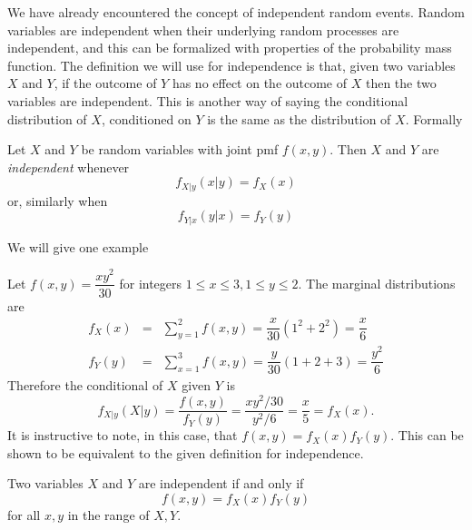\documentclass[../main.tex]{subfiles}
\begin{document}
We have already encountered the concept of independent random events. Random variables
are independent when their underlying random processes are independent, and this
can be formalized with properties of the probability mass function. The definition
we will use for independence is that, given two variables $X$ and $Y$, if the outcome
of $Y$ has no effect on the outcome of $X$ then the two variables are independent. 
This is another way of saying the conditional distribution of $X$, conditioned on $Y$
is the same as the distribution of $X$. Formally
\begin{definition}
	Let $X$ and $Y$ be random variables with joint pmf $f(x,y)$. Then $X$ and $Y$
	are \textit{independent} whenever
	$$f_{X|y}(x|y) = f_X(x)$$
	or, similarly when
	$$f_{Y|x}(y|x) = f_Y(y)$$
\end{definition}
We will give one example
\begin{example}
	Let $f(x,y) = \dfrac{xy^2}{30}$ for integers $1 \leq x \leq 3, 1\leq y \leq 2$. The marginal distributions are
	\begin{eqnarray*}
		f_X(x) &=& \sum_{y=1}^2 f(x,y) = \dfrac{x}{30}(1^2+2^2) = \dfrac{x}{6} \\
		f_Y(y) &=& \sum_{x=1}^3 f(x,y) = \dfrac{y}{30}(1+2+3) = \dfrac{y^2}{6}
	\end{eqnarray*}
	Therefore the conditional of $X$ given $Y$ is
	$$f_{X|y}(X|y) = \dfrac{f(x,y)}{f_{Y}(y)} = \dfrac{xy^2/30}{y^2/6} = \dfrac{x}{5} = f_X(x).$$
	It is instructive to note, in this case, that $f(x,y) = f_X(x)f_Y(y)$. This can be
	shown to be equivalent to the given definition for independence.
\end{example}
\begin{remark}
	Two variables $X$ and $Y$ are independent if and only if
	$$f(x,y) = f_X(x)f_Y(y)$$ for all $x,y$ in the range of $X,Y$.
\end{remark}
\end{document}
